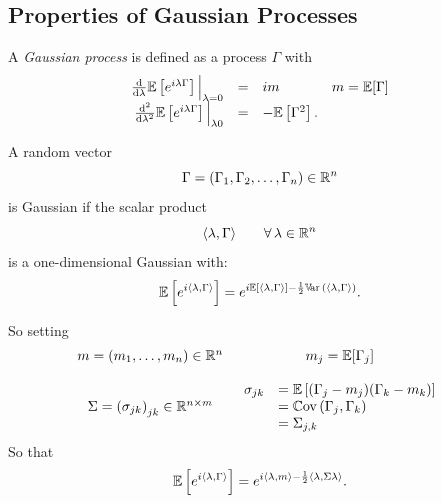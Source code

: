 \documentclass[12pt]{report}
\begin{document}
\subsection{Properties of Gaussian Processes}
\begin{definition}
	A \emph{Gaussian process} is defined as a process $\Gamma$ with
	\begin{equation*}
		\begin{array}{rclr}
			\frac{\mathop{}\!\mathrm{d}}{\mathop{}\!\mathrm{d} \lambda}\mathbb{E}\left[e^{i\lambda\Gamma}\right]\Big|_{\lambda=0}&=&im&m=\mathbb{E}[\Gamma]\\
			\frac{\mathop{}\!\mathrm{d}^{2}}{\mathop{}\!\mathrm{d}\lambda^{2}}\mathbb{E}\left[e^{i\lambda\Gamma}\right]\Big|_{\lambda 0}&=&-\mathbb{E}\left[\Gamma^{2}\right].&
		\end{array}
	\end{equation*}
\end{definition}
\begin{definition}
	A random vector
	\begin{equation*}
		\Gamma=(\Gamma_{1},\Gamma_{2},\ldots,\Gamma_{n})\in\mathbb{R}^{n}
	\end{equation*}
	is Gaussian if the scalar product 
	\begin{equation*}
		\langle\lambda,\Gamma\rangle\qquad\forall\,\lambda\in\mathbb{R}^{n}
	\end{equation*}
	is a one-dimensional Gaussian \rv{} with:
	\begin{equation*}
		\mathbb{E}\left[e^{i\langle\lambda,\Gamma\rangle}\right]=e^{i\mathbb{E}\left[\langle\lambda,\Gamma\rangle\right]-\frac{1}{2}\mathbb{V}\!\mathrm{ar}\,\left(\langle\lambda,\Gamma\rangle\right)}.
	\end{equation*}
\end{definition}
So setting 
\begin{equation*}
	\begin{array}{cc}
		m=(m_{1},\ldots,m_{n})\in\mathbb{R}^{n}&m_{j}=\mathbb{E}[\Gamma_{j}]\\
		&\\
		\Sigma={(\sigma_{jk})}_{jk}\in\mathbb{R}^{n\times m}&\begin{array}{rl}
			\sigma_{jk}&=\mathbb{E}\left[(\Gamma_{j}-m_{j})(\Gamma_{k}-m_{k})\right]\\
			&=\mathbb{C}\mathrm{ov}\,(\Gamma_{j},\Gamma_{k})\\
			&=\Sigma_{j,k}
		\end{array}
	\end{array}
\end{equation*}
So that 
\begin{equation*}
	\mathbb{E}\left[e^{i\langle\lambda,\Gamma\rangle}\right]=e^{i\langle\lambda,m\rangle-\frac{1}{2}	\langle\lambda,\Sigma\lambda\rangle}.
\end{equation*}
\end{document}
